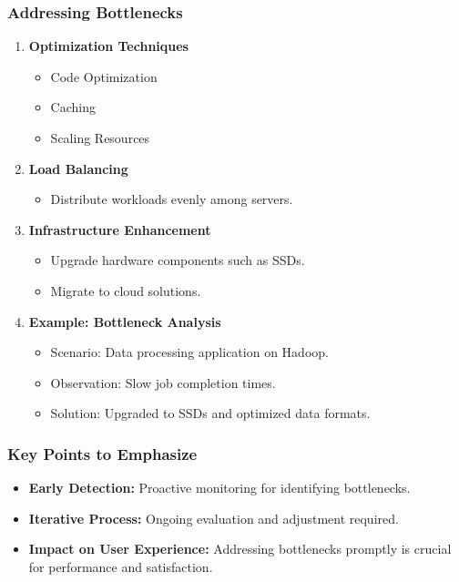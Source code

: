 \documentclass[aspectratio=169]{beamer}
\begin{document}
\begin{frame}[fragile]
    \frametitle{Addressing Bottlenecks}
    \begin{enumerate}
        \item \textbf{Optimization Techniques}
        \begin{itemize}
            \item Code Optimization
            \item Caching
            \item Scaling Resources
        \end{itemize}

        \item \textbf{Load Balancing}
        \begin{itemize}
            \item Distribute workloads evenly among servers.
        \end{itemize}

        \item \textbf{Infrastructure Enhancement}
        \begin{itemize}
            \item Upgrade hardware components such as SSDs.
            \item Migrate to cloud solutions.
        \end{itemize}

        \item \textbf{Example: Bottleneck Analysis}
        \begin{itemize}
            \item Scenario: Data processing application on Hadoop.
            \item Observation: Slow job completion times.
            \item Solution: Upgraded to SSDs and optimized data formats.
        \end{itemize}
    \end{enumerate}
\end{frame}

\begin{frame}[fragile]
    \frametitle{Key Points to Emphasize}
    \begin{itemize}
        \item \textbf{Early Detection:} Proactive monitoring for identifying bottlenecks.
        \item \textbf{Iterative Process:} Ongoing evaluation and adjustment required.
        \item \textbf{Impact on User Experience:} Addressing bottlenecks promptly is crucial for performance and satisfaction.
    \end{itemize}
\end{frame}
\end{document}
